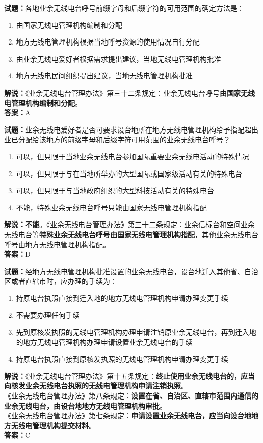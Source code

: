 \documentclass{ctexbook}
\begin{document}
\bigskip




\noindent\textbf{试题：}各地业余无线电台呼号前缀字母和后缀字符的可用范围的确定方法是：
\begin{enumerate}[leftmargin=3em]
\item 由国家无线电管理机构编制和分配
\item 地方无线电管理机构根据当地呼号资源的使用情况自行分配
\item 由业余无线电爱好者根据需求提出建议，当地无线电管理机构批准
\item 地方无线电民间组织提出建议，当地无线电管理机构批准
\end{enumerate}
\noindent\textbf{解说：}《业余无线电台管理办法》第三十二条规定：业余无线电台呼号\textbf{由国家无线电管理机构编制和分配}。\\\noindent\textbf{答案：}A

\bigskip




\noindent\textbf{试题：}业余无线电爱好者是否可要求设台地所在地方无线电管理机构给予指配超出业已分配给该地方的前缀字母和后缀字符可用范围的业余无线电台呼号？
\begin{enumerate}[leftmargin=3em]
\item 可以，但只限于当地业余无线电台参加国际重要业余无线电活动的特殊情况
\item 可以，但只限于与在当地所举办的大型国际或国家级活动有关的特殊电台
\item 可以，但只限于与当地政府组织的大型科技活动有关的特殊电台
\item 不能，特殊业余无线电台呼号只能由国家无线电管理机构指配
\end{enumerate}
\textbf{解说：不能}。《业余无线电台管理办法》第三十二条规定：业余信标台和空间业余无线电台等\textbf{特殊业余无线电台呼号由国家无线电管理机构指配}，其他业余无线电台呼号由地方无线电管理机构指配。\\\noindent\textbf{答案：}D

\bigskip




\noindent\textbf{试题：}经地方无线电管理机构批准设置的业余无线电台，设台地迁入其他省、自治区或者直辖市时，应办理的手续为：
\begin{enumerate}[leftmargin=3em]
\item 持原电台执照直接到迁入地的地方无线电管理机构申请办理变更手续
\item 不需要办理任何手续
\item 先到原核发执照的无线电管理机构办理申请注销原业余无线电台，再到迁入地的地方无线电管理机构办理申请设置业余无线电台的手续
\item 持原电台执照直接到原核发执照的无线电管理机构申请办理变更手续
\end{enumerate}
\noindent\textbf{解说：}《业余无线电台管理办法》第十五条规定：\textbf{终止使用业余无线电台的，应当向核发业余无线电台执照的无线电管理机构申请注销执照}。\\
《业余无线电台管理办法》第八条规定：\textbf{设置在省、自治区、直辖市范围内通信的业余无线电台，由设台地地方无线电管理机构审批}。\\
《业余无线电台管理办法》第七条规定：\textbf{申请设置业余无线电台，应当向设台地地方无线电管理机构提交材料}。\\\noindent\textbf{答案：}C
\end{document}
